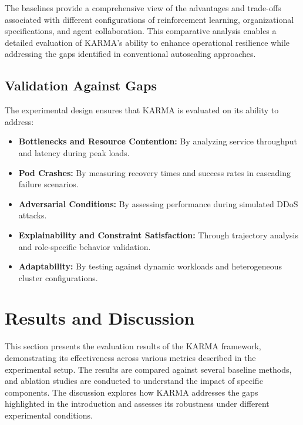 \documentclass[conference]{IEEEtran}
\begin{document}
\noindent The baselines provide a comprehensive view of the advantages and trade-offs associated with different configurations of reinforcement learning, organizational specifications, and agent collaboration. This comparative analysis enables a detailed evaluation of KARMA's ability to enhance operational resilience while addressing the gaps identified in conventional autoscaling approaches.

\subsection{Validation Against Gaps}

The experimental design ensures that KARMA is evaluated on its ability to address:
\begin{itemize}
    \item \textbf{Bottlenecks and Resource Contention:} By analyzing service throughput and latency during peak loads.
    \item \textbf{Pod Crashes:} By measuring recovery times and success rates in cascading failure scenarios.
    \item \textbf{Adversarial Conditions:} By assessing performance during simulated DDoS attacks.
    \item \textbf{Explainability and Constraint Satisfaction:} Through trajectory analysis and role-specific behavior validation.
    \item \textbf{Adaptability:} By testing against dynamic workloads and heterogeneous cluster configurations.
\end{itemize}



\section{Results and Discussion}
\label{sec:results}

This section presents the evaluation results of the KARMA framework, demonstrating its effectiveness across various metrics described in the experimental setup. The results are compared against several baseline methods, and ablation studies are conducted to understand the impact of specific components. The discussion explores how KARMA addresses the gaps highlighted in the introduction and assesses its robustness under different experimental conditions.
\end{document}
